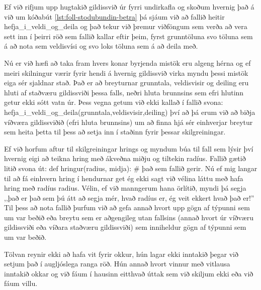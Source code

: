 Ef við rifjum upp hugtakið gildissvið úr fyrri undirkafla og skoðum hvernig það á við um kóðabút \ref{lst:foll-stodubundin-betra} þá sjáum við að fallið heitir hefja\_i\_veldi\_og\_deila og það tekur við þremur viðföngum sem verða að vera sett inn í þeirri röð sem fallið kallar eftir þeim, fyrst grunntöluna svo töluna sem á að nota sem veldisvísi og svo loks töluna sem á að deila með.

Nú er við hæfi að taka fram hvers konar byrjenda mistök eru algeng hérna og ef meiri skilningur værir fyrir hendi á hvernig gildissvið virka myndu þessi mistök eiga sér sjaldnar stað.
Það er að breyturnar grunntala, veldisvisir og deiling eru hluti af staðværu gildissviði þessa falls, neðri hluta brunnsins sem efri hlutinn getur ekki sótt vatn úr.
Þess vegna getum við ekki kallað í fallið svona: hefja\_i\_veldi\_og\_deila(grunntala,veldisvisir,deiling) því að þá erum við að biðja víðværa gildissviðið (efri hluta brunnsins) um að finna hjá sér einhverjar breytur sem heita þetta til þess að setja inn í staðinn fyrir þessar skilgreiningar.

Ef við horfum aftur til skilgreiningar hrings og myndum búa til fall sem lýsir því hvernig eigi að teikna hring með ákveðna miðju og tiltekin radíus.
Fallið gætið litið svona út: \newline def hringur(radius, midja): \newline \phantom{----}\# það sem fallið gerir. \newline
Nú ef mig langar til að fá einhvern hring í hendurnar get ég ekki sagt við vélina láttu með hafa hring með radíus radius.
Vélin, ef við manngerum hana örlítið, myndi þá segja ,,það er það sem þú átt að segja mér, hvað radíus er, ég veit ekkert hvað það er!''
Til þess að nota fallið þurfum við að gefa annað hvort upp gögn af týpunni sem um var beðið eða breytu sem er aðgengileg utan fallsins (annað hvort úr víðværu gildissviði eða víðara staðværu gildissviði) sem inniheldur gögn af týpunni sem um var beðið.

Tölvan reynir ekki að hafa vit fyrir okkur, hún lagar ekki inntakið þegar við setjum það í augljóslega ranga röð.
Hún annað hvort vinnur með vitlausa inntakið okkar og við fáum í hausinn eitthvað úttak sem við skiljum ekki eða við fáum villu.

